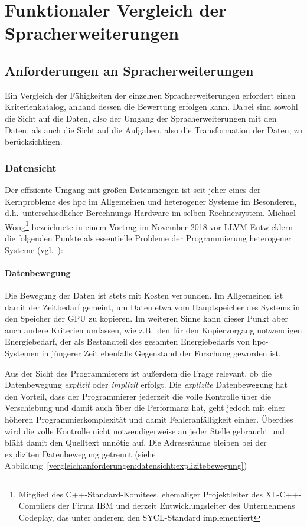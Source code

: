 \section{Funktionaler Vergleich der Spracherweiterungen}
\label{vergleich}

\subsection{Anforderungen an Spracherweiterungen}
\label{vergleich:anforderungen}

Ein Vergleich der Fähigkeiten der einzelnen Spracherweiterungen erfordert einen
Kriterienkatalog, anhand dessen die Bewertung erfolgen kann. Dabei sind sowohl
die Sicht auf die Daten, also der Umgang der Spracherweiterungen mit den Daten,
als auch die Sicht auf die Aufgaben, also die Transformation der Daten, zu
berücksichtigen.

\subsubsection{Datensicht}
\label{vergleich:anforderungen:datensicht}

Der effiziente Umgang mit großen Datenmengen ist seit jeher eines der
Kernprobleme des \gls{hpc} im Allgemeinen und heterogener Systeme im Besonderen,
d.h.\ unterschiedlicher Berechnungs-Hardware im selben Rechnersystem. Michael
Wong\footnote{Mitglied des C++-Standard-Komitees, ehemaliger Projektleiter des
XL-C++-Compilers der Firma IBM und derzeit Entwicklungsleiter des Unternehmens
Codeplay, das unter anderem den SYCL-Standard implementiert} bezeichnete in
einem Vortrag im November 2018 vor LLVM-Entwicklern die folgenden Punkte als
essentielle Probleme der Programmierung heterogener Systeme
(vgl.~\cite{wong2018}):

\paragraph{Datenbewegung} 
Die Bewegung der Daten ist stets mit Kosten verbunden. Im Allgemeinen ist damit
der Zeitbedarf gemeint, um Daten etwa vom Hauptspeicher des Systems in den
Speicher der GPU zu kopieren. Im weiteren Sinne kann dieser Punkt aber auch
andere Kriterien umfassen, wie z.B.\ den für den Kopiervorgang notwendigen
Energiebedarf, der als Bestandteil des gesamten Energiebedarfs von
\gls{hpc}-Systemen in jüngerer Zeit ebenfalls Gegenstand der Forschung geworden
ist.

Aus der Sicht des Programmierers ist außerdem die Frage relevant, ob die
Datenbewegung \textit{explizit} oder \textit{implizit} erfolgt. Die
\textit{explizite} Datenbewegung hat den Vorteil, dass der Programmierer
jederzeit die volle Kontrolle über die Verschiebung und damit auch über die
Performanz hat, geht jedoch mit einer höheren Programmierkomplexität und damit
Fehleranfälligkeit einher. Überdies wird die volle Kontrolle nicht
notwendigerweise an jeder Stelle gebraucht und bläht damit den Quelltext unnötig
auf. Die Adressräume bleiben bei der expliziten Datenbewegung getrennt (siehe
Abbildung~\ref{vergleich:anforderungen:datensicht:explizitebewegung})


